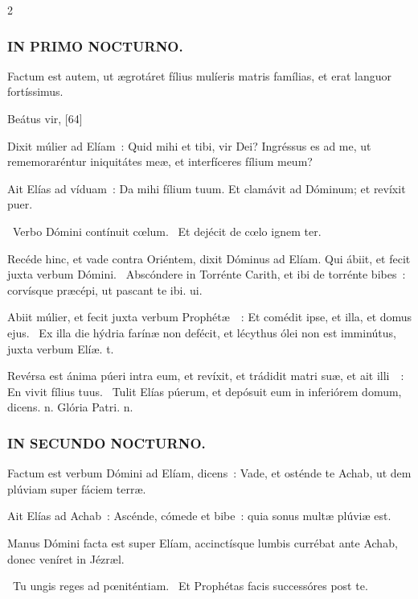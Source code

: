 \documentclass[9pt,twoside]{extarticle}
\begin{document}
\begin{multicols}{2}
{{\subsubsection*{\center \textsc{IN PRIMO NOCTURNO.}}
\begin{tightlist}{}
\item {} Factum est autem, ut ægrotáret fílius mulíeris matris famílias, et erat languor fortíssimus.
\item {} Beátus vir,  [64]
\item {} Dixit múlier ad Elíam~: Quid mihi et tibi, vir Dei? Ingréssus es ad me, ut rememoraréntur iniquitátes meæ, et interfíceres fílium meum?
\item {} Ait Elías ad víduam~: Da mihi fílium tuum. Et clamávit ad Dóminum; et revíxit puer.
\item {}~Verbo Dómini contínuit cœlum. ~Et dejécit de cœlo ignem ter.
\item {}
\item {} Recéde hinc, et vade contra Oriéntem, dixit Dóminus ad Elíam. \textred{*} Qui ábiit, et fecit juxta verbum Dómini. ~Abscóndere in Torrénte Carith, et ibi de torrénte bibes~: corvísque præcépi, ut pascant te ibi. ui.
\item {} Abiit múlier, et fecit juxta verbum Prophétæ~~: \textred{*} Et comédit ipse, et illa, et domus ejus. ~Ex illa die hýdria farínæ non defécit, et lécythus ólei non est imminútus, juxta verbum Elíæ. t.
\item {} Revérsa est ánima púeri intra eum, et revíxit, et trádidit matri suæ, et ait illi~~: \textred{*} En vivit fílius tuus. ~Tulit Elías púerum, et depósuit eum in inferiórem domum, dicens. n. Glória Patri. n.
\end{tightlist}

\subsubsection*{\center \textsc{IN SECUNDO NOCTURNO.}}
\begin{tightlist}{}
\item {} Factum est verbum Dómini ad Elíam, dicens~: Vade, et osténde te Achab, ut dem plúviam super fáciem terræ.
\item {} Ait Elías ad Achab~: Ascénde, cómede et bibe~: quia sonus multæ plúviæ est.
\item {} Manus Dómini facta est super Elíam, accinctísque lumbis currébat ante Achab, donec veníret in Jézræl.
\item {}~Tu ungis reges ad pœniténtiam. ~Et Prophétas facis successóres post te.
\end{tightlist}

}}
\end{multicols}
\end{document}
